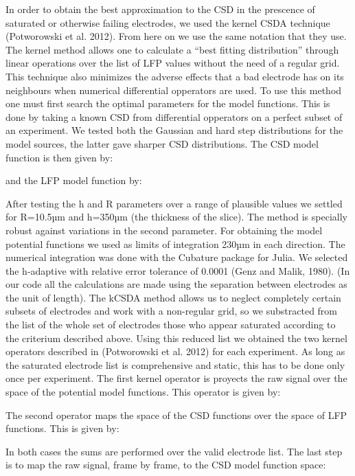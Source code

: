             
             In order to obtain the best approximation to the CSD in the prescence of saturated or otherwise failing electrodes, we used the kernel CSDA technique (Potworowski et al. 2012). From here on we use the same notation that they use.  The kernel method allows one to calculate a ``best fitting distribution'' through linear operations over the list of LFP values without the need of a regular grid. This technique also minimizes the adverse effects that a bad electrode has on its neighbours when numerical differential opperators are used. To use this method one must first search the optimal parameters for the model functions. This is done by taking a known CSD from differential opperators on a perfect subset of an experiment. We tested both the Gaussian and hard step distributions for the model sources, the latter gave sharper CSD distributions. The CSD model function is then given by:

             and the LFP model function by:
         

             After testing the h and R parameters over a range of plausible values we settled for R=10.5µm and h=350µm (the thickness of the slice). The method is specially robust against variations in the second parameter. For obtaining the model potential functions we used as limits of integration 230µm in each direction. The numerical integration was done with the Cubature package  for Julia. We selected the h-adaptive with relative error tolerance of 0.0001 (Genz and Malik, 1980). (In our code all the calculations are made using the separation between electrodes as the unit of length).  
             The kCSDA method allows us to neglect completely certain subsets of electrodes and work with a non-regular grid, so we substracted from the list of the whole set of electrodes those who appear saturated according to the criterium described above. Using this reduced list we obtained the two kernel operators described in (Potworowski et al. 2012) for each experiment. As long as the saturated electrode list is comprehensive and static, this has to be done only once per experiment. The first kernel operator is proyects the raw signal over the space of the potential model functions. This operator is given by:

             The second operator maps the space of the CSD functions over the space of LFP functions. This is given by:

             In both cases the sums are performed over the valid electrode list.
             The last step is to map the raw signal, frame by frame, to the CSD model function space:

